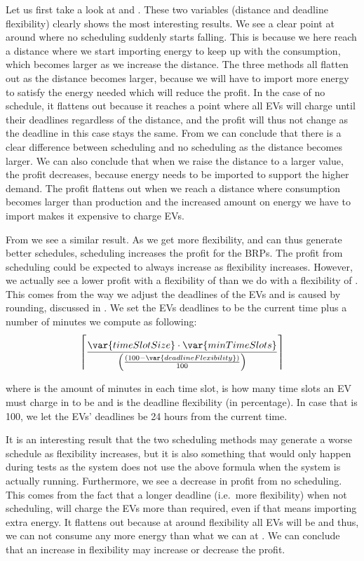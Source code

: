 Let us first take a look at  and . These two variables (distance and deadline flexibility) clearly shows the most interesting results. We see a clear point at around  where no scheduling suddenly starts falling. This is because we here reach a distance where we start importing energy to keep up with the consumption, which becomes larger as we increase the distance. The three methods all flatten out as the distance becomes larger, because we will have to import more energy to satisfy the energy needed which will reduce the profit. In the case of no schedule, it flattens out because it reaches a point where all EVs will charge until their deadlines regardless of the distance, and the profit will thus not change as the deadline in this case stays the same. From  we can conclude that there is a clear difference between scheduling and no scheduling as the distance becomes larger. We can also conclude that when we raise the distance to a larger value, the profit decreases, because energy needs to be imported to support the higher demand. The profit flattens out when we reach a distance where consumption becomes larger than production and the increased amount on energy we have to import makes it expensive to charge EVs.

From  we see a similar result. As we get more flexibility, and can thus generate better schedules, scheduling increases the profit for the BRPs. The profit from scheduling could be expected to always increase as flexibility increases. However, we actually see a lower profit with a flexibility of  than we do with a flexibility of . This comes from the way we adjust the deadlines of the EVs and is caused by rounding, discussed in . We set the EVs deadlines to be the current time plus a number of minutes we compute as following:
\[
  \left\lceil \frac{\var{timeSlotSize} \cdot \var{minTimeSlots}} { \left( \frac{(100-\var{deadlineFlexibility})}{100}\right) } \right\rceil
\]

where  is the amount of minutes in each time slot,  is how many time slots an EV must charge in to be  and  is the deadline flexibility (in percentage). In case that  is \num{100}, we let the EVs' deadlines be \num{24} hours from the current time. 

It is an interesting result that the two scheduling methods may generate a worse schedule as flexibility increases, but it is also something that would only happen during tests as the system does not use the above formula when the system is actually running. Furthermore, we see a decrease in profit from no scheduling. This comes from the fact that a longer deadline (i.e.\ more flexibility) when not scheduling, will charge the EVs more than required, even if that means importing extra energy. It flattens out because at around  flexibility all EVs will be  and thus, we can  not consume any more energy than what we can at . We can conclude that an increase in flexibility may increase or decrease the profit.

